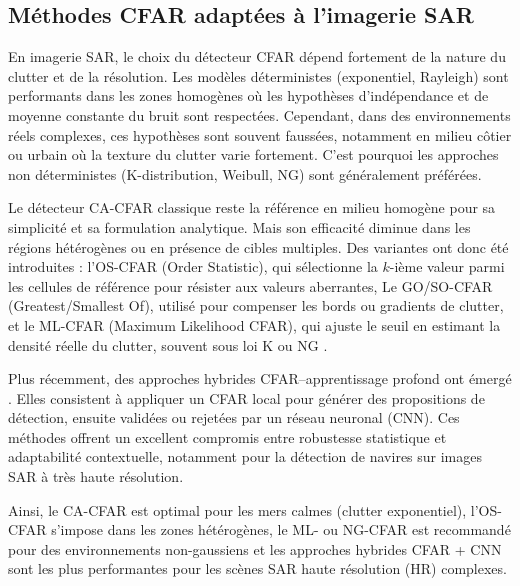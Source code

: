 


\subsection{Méthodes CFAR adaptées à l’imagerie SAR}

En imagerie SAR, le choix du détecteur CFAR dépend fortement de la nature du clutter et de la résolution.  
Les modèles déterministes (exponentiel, Rayleigh) sont performants dans les zones homogènes où les hypothèses d’indépendance et de moyenne constante du bruit sont respectées.  
Cependant, dans des environnements réels complexes, ces hypothèses sont souvent faussées, notamment en milieu côtier ou urbain où la texture du clutter varie fortement.  
C’est pourquoi les approches non déterministes (K-distribution, Weibull, NG) sont généralement préférées.

Le détecteur CA-CFAR classique reste la référence en milieu homogène pour sa simplicité et sa formulation analytique.  
Mais son efficacité diminue dans les régions hétérogènes ou en présence de cibles multiples.  
Des variantes ont donc été introduites :  
l’OS-CFAR (Order Statistic), qui sélectionne la $k$-ième valeur parmi les cellules de référence pour résister aux valeurs aberrantes,  
Le GO/SO-CFAR (Greatest/Smallest Of), utilisé pour compenser les bords ou gradients de clutter,  
et le ML-CFAR (Maximum Likelihood CFAR), qui ajuste le seuil en estimant la densité réelle du clutter, souvent sous loi K ou NG \cite{habib2008}.  

Plus récemment, des approches hybrides CFAR–apprentissage profond ont émergé \cite{yang2024}.  
Elles consistent à appliquer un CFAR local pour générer des propositions de détection, ensuite validées ou rejetées par un réseau neuronal (CNN).  
Ces méthodes offrent un excellent compromis entre robustesse statistique et adaptabilité contextuelle, notamment pour la détection de navires sur images SAR à très haute résolution.

Ainsi, le CA-CFAR est optimal pour les mers calmes (clutter exponentiel), l’OS-CFAR s’impose dans les zones hétérogènes, le ML- ou NG-CFAR est recommandé pour des environnements non-gaussiens et les approches hybrides CFAR + CNN sont les plus performantes pour les scènes SAR haute résolution (HR) complexes.

